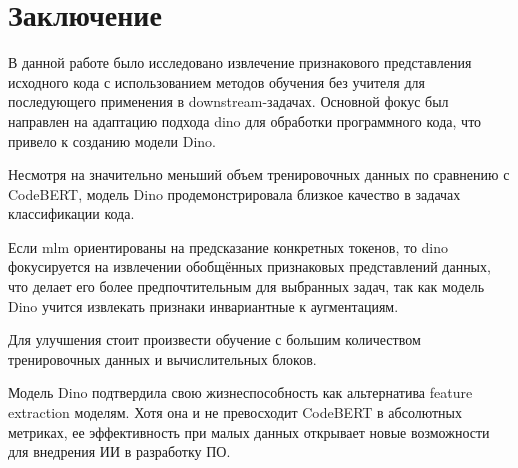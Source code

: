 \documentclass[../document.tex]{subfiles}
\begin{document}
\section{Заключение}
\par В данной работе было исследовано извлечение признакового представления исходного кода с использованием методов обучения без учителя для последующего применения в downstream-задачах. Основной фокус был направлен на адаптацию подхода \acrshort{dino} для обработки программного кода, что привело к созданию модели Dino.
\par Несмотря на значительно меньший объем тренировочных данных по сравнению с CodeBERT, модель Dino продемонстрировала близкое качество в задачах классификации кода.
\par Если \acrshort{mlm} ориентированы на предсказание конкретных токенов, то \acrshort{dino} фокусируется на извлечении обобщённых признаковых представлений данных, что делает его более предпочтительным для выбранных задач, так как модель Dino учится извлекать признаки инвариантные к аугментациям.
\par Для улучшения стоит произвести обучение с большим количеством тренировочных данных и вычислительных блоков.
\par Модель Dino подтвердила свою жизнеспособность как альтернатива feature extraction моделям. Хотя она и не превосходит CodeBERT в абсолютных метриках, ее эффективность при малых данных открывает новые возможности для внедрения ИИ в разработку ПО.
\end{document}
